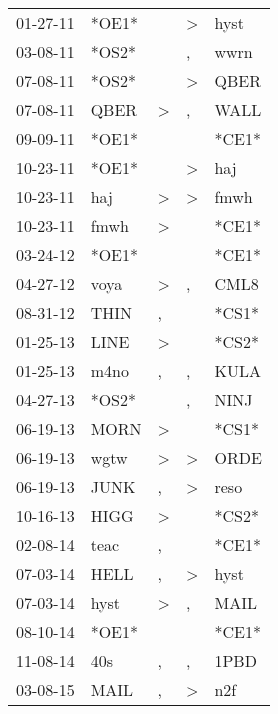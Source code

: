 \begin{supertabular}{lllll}
 01-27-11 &  *OE1* &                  &     \textgreater &   hyst \\
 03-08-11 &  *OS2* &                  &                , &   wwrn \\
 07-08-11 &  *OS2* &                  &     \textgreater &   QBER \\
 07-08-11 &   QBER &     \textgreater &                , &   WALL \\
 09-09-11 &  *OE1* &                  &                  &  *CE1* \\
 10-23-11 &  *OE1* &                  &     \textgreater &    haj \\
 10-23-11 &    haj &     \textgreater &     \textgreater &   fmwh \\
 10-23-11 &   fmwh &     \textgreater &                  &  *CE1* \\
 03-24-12 &  *OE1* &                  &                  &  *CE1* \\
 04-27-12 &   voya &     \textgreater &                , &   CML8 \\
 08-31-12 &   THIN &                , &                  &  *CS1* \\
 01-25-13 &   LINE &     \textgreater &                  &  *CS2* \\
 01-25-13 &   m4no &                , &                , &   KULA \\
 04-27-13 &  *OS2* &                  &                , &   NINJ \\
 06-19-13 &   MORN &     \textgreater &                  &  *CS1* \\
 06-19-13 &   wgtw &     \textgreater &     \textgreater &   ORDE \\
 06-19-13 &   JUNK &                , &     \textgreater &   reso \\
 10-16-13 &   HIGG &     \textgreater &                  &  *CS2* \\
 02-08-14 &   teac &                , &                  &  *CE1* \\
 07-03-14 &   HELL &                , &     \textgreater &   hyst \\
 07-03-14 &   hyst &     \textgreater &                , &   MAIL \\
 08-10-14 &  *OE1* &                  &                  &  *CE1* \\
 11-08-14 &    40s &                , &                , &   1PBD \\
 03-08-15 &   MAIL &                , &     \textgreater &    n2f \\

\end{supertabular}
